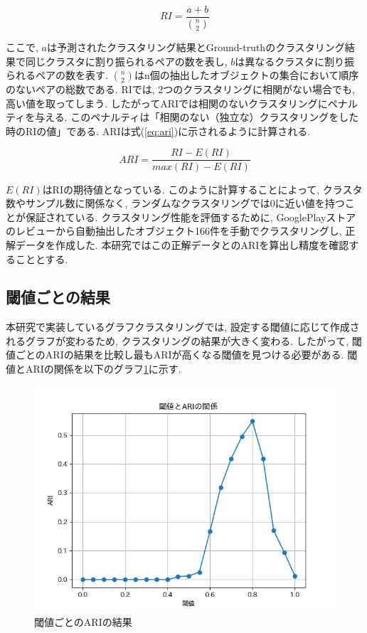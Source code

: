 \begin{equation}
  \label{eq:ri}
  RI = \frac{a+b}{\binom{n}{2}}
\end{equation}

ここで, \(a\)は予測されたクラスタリング結果とGround-truthのクラスタリング結果で同じクラスタに割り振られるペアの数を表し, \(b\)は異なるクラスタに割り振られるペアの数を表す. \(\binom{n}{2}\)はn個の抽出したオブジェクトの集合において順序のないペアの総数である. 
RIでは, 2つのクラスタリングに相関がない場合でも, 高い値を取ってしまう. したがってARIでは相関のないクラスタリングにペナルティを与える. このペナルティは「相関のない（独立な）クラスタリングをした時のRIの値」である. ARIは式(\ref{eq:ari})に示されるように計算される. 

\begin{equation}
  \label{eq:ari}
  ARI = \frac{RI-E(RI)}{max(RI)-E(RI)}
\end{equation}

\(E(RI)\)はRIの期待値となっている. このように計算することによって, クラスタ数やサンプル数に関係なく, ランダムなクラスタリングでは0に近い値を持つことが保証されている. 
クラスタリング性能を評価するために, GooglePlayストアのレビューから自動抽出したオブジェクト166件を手動でクラスタリングし, 正解データを作成した. 本研究ではこの正解データとのARIを算出し精度を確認することとする. 

\subsection{閾値ごとの結果}
本研究で実装しているグラフクラスタリングでは, 設定する閾値に応じて作成されるグラフが変わるため, クラスタリングの結果が大きく変わる. したがって, 閾値ごとのARIの結果を比較し最もARIが高くなる閾値を見つける必要がある. 
閾値とARIの関係を以下のグラフ\ref{fig:cw_graph}に示す.

\begin{figure}[hbtp]
  \centering
  \includegraphics[scale=0.8]
    {contents/images/cw_graph.png}
  \caption{閾値ごとのARIの結果\label{fig:cw_graph}}
\end{figure}

